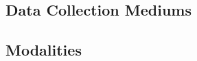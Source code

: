 \documentclass[manuscript,screen,review]{acmart}
\begin{document}
\subsection{Data Collection Mediums} 



\subsection{Modalities} \label{sec:Modalities}
\end{document}
